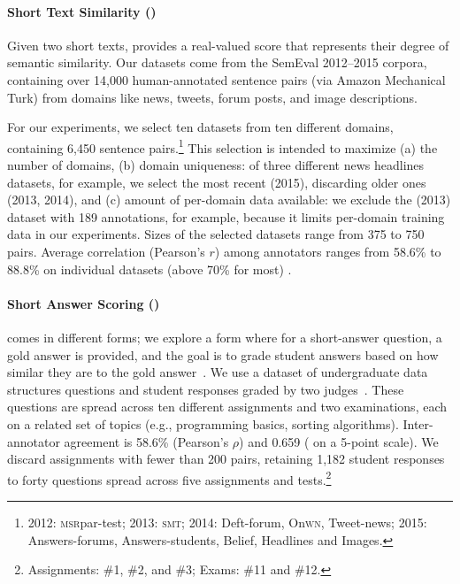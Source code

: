 
\paragraph{Short Text Similarity (\sts{})}
\label{section:tasks-and-datasets-sts}
Given two short texts, \sts{} provides a real-valued
score that represents their degree of semantic similarity.  Our \sts{} datasets
come from the SemEval 2012--2015 corpora, containing over 14,000
human-annotated sentence pairs (via Amazon Mechanical Turk) from domains like
news, tweets, forum posts, and image descriptions.

For our experiments, we select ten datasets from ten different
domains, containing 6,450 sentence pairs.\footnote{2012: \textsc{msr}par-test;
2013: \textsc{smt}; 2014: Deft-forum, On\textsc{wn}, Tweet-news; 2015: Answers-forums,
Answers-students, Belief, Headlines and Images.}  This selection is
intended to maximize (a) the number of domains, (b) domain uniqueness:
of three different news headlines datasets, for example, we select the
most recent (2015), discarding older ones (2013, 2014), and (c) amount of
per-domain data available: we exclude the  (2013) dataset with 189
annotations, for example, because it limits per-domain training data
in our experiments. Sizes of the selected datasets range from 375 to 750 pairs.
Average correlation (Pearson's $r$) among annotators ranges from 58.6\% to
88.8\% on individual datasets (above 70\% for most)
\cite{Agirre:2012,Agirre:2013,Agirre:2014,Agirre:2015}.

\paragraph{Short Answer Scoring (\sas{})}
\label{section:tasks-and-datasets-sas}
\sas{} comes in different forms; we explore a form where for a
short-answer question, a gold answer is provided, and the goal is to
grade student answers based on how similar they are to the gold
answer~\cite{Ramachandran:2015}.  We use a dataset of undergraduate data
structures questions and student responses graded by two
judges~\cite{Mohler:2011}.  These questions are spread across ten
different assignments and two examinations, each on a related set of
topics (e.g., programming basics, sorting algorithms).
Inter-annotator agreement is 58.6\% (Pearson's $\rho$) and 0.659 (
on a 5-point scale).  We discard assignments with fewer than 200 pairs,
retaining 1,182 student responses to forty questions spread across five
assignments and tests.\footnote{Assignments: \#1, \#2, and \#3; Exams:
\#11 and \#12.}

